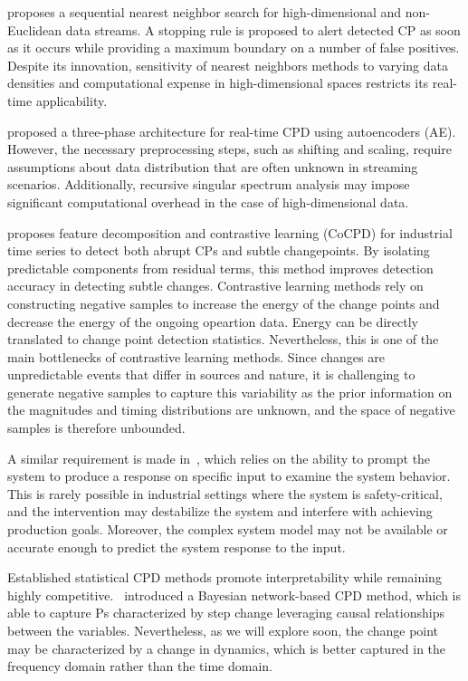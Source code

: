 \citet{Chu2022} proposes a sequential nearest neighbor search for high-dimensional and non-Euclidean data streams. A stopping rule is proposed to alert detected CP as soon as it occurs while providing a maximum boundary on a number of false positives. Despite its innovation, sensitivity of nearest neighbors methods to varying data densities and computational expense in high-dimensional spaces restricts its real-time applicability.

\citet{Gupta2022} proposed a three-phase architecture for real-time CPD using autoencoders (AE). However, the necessary preprocessing steps, such as shifting and scaling, require assumptions about data distribution that are often unknown in streaming scenarios. Additionally, recursive singular spectrum analysis may impose significant computational overhead in the case of high-dimensional data.

\citet{Bao2024} proposes feature decomposition and contrastive learning (CoCPD) for industrial time series to detect both abrupt CPs and subtle changepoints. By isolating predictable components from residual terms, this method improves detection accuracy in detecting subtle changes. Contrastive learning methods rely on constructing negative samples to increase the energy of the change points and decrease the energy of the ongoing opeartion data. Energy can be directly translated to change point detection statistics. Nevertheless, this is one of the main bottlenecks of contrastive learning methods. Since changes are unpredictable events that differ in sources and nature, it is challenging to generate negative samples to capture this variability as the prior information on the magnitudes and timing distributions are unknown, and the space of negative samples is therefore unbounded.

A similar requirement is made in~\citet{Hayashi2019}, which relies on the ability to prompt the system to produce a response on specific input to examine the system behavior. This is rarely possible in industrial settings where the system is safety-critical, and the intervention may destabilize the system and interfere with achieving production goals. Moreover, the complex system model may not be available or accurate enough to predict the system response to the input.

Established statistical CPD methods promote interpretability while remaining highly competitive.~\citet{Rajaganapathy2022} introduced a Bayesian network-based CPD method, which is able to capture Ps characterized by step change leveraging causal relationships between the variables. Nevertheless, as we will explore soon, the change point may be characterized by a change in dynamics, which is better captured in the frequency domain rather than the time domain.

